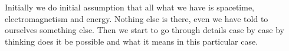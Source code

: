 Initially we do initial assumption that all what we have is spacetime,
electromagnetism and energy. Nothing else is there, even we have told to
ourselves something else. Then we start to go through details case by case
by thinking does it be possible and what it means in this particular case.

